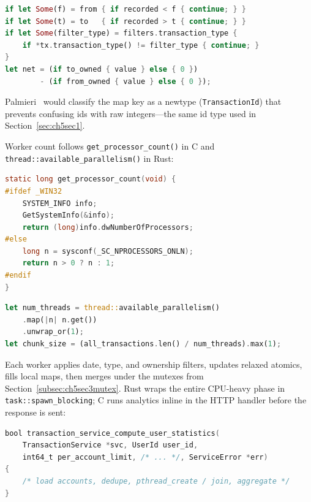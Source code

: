 \begin{lstlisting}[language=Rust, caption={transaction.rs (service) --- Same filters
inside the scoped worker.}]
if let Some(f) = from { if recorded < f { continue; } }
if let Some(t) = to   { if recorded > t { continue; } }
if let Some(filter_type) = filters.transaction_type {
    if *tx.transaction_type() != filter_type { continue; }
}
let net = (if to_owned { value } else { 0 })
        - (if from_owned { value } else { 0 });
\end{lstlisting}

Palmieri~\cite{Palmieri2022} would classify the map key as a newtype
(\texttt{TransactionId}) that prevents confusing ids with raw integers---the same id
type used in Section~\ref{sec:ch5sec1}.

Worker count follows \texttt{get\_processor\_count()} in C and
\texttt{thread::available\_parallelism()} in Rust:

\begin{lstlisting}[language=C, caption={transaction\_service.c --- Thread count from
the host OS.}]
static long get_processor_count(void) {
#ifdef _WIN32
    SYSTEM_INFO info;
    GetSystemInfo(&info);
    return (long)info.dwNumberOfProcessors;
#else
    long n = sysconf(_SC_NPROCESSORS_ONLN);
    return n > 0 ? n : 1;
#endif
}
\end{lstlisting}

\begin{lstlisting}[language=Rust, caption={transaction.rs (service) --- Same intent.}]
let num_threads = thread::available_parallelism()
    .map(|n| n.get())
    .unwrap_or(1);
let chunk_size = (all_transactions.len() / num_threads).max(1);
\end{lstlisting}

Each worker applies date, type, and ownership filters, updates relaxed atomics, fills
local maps, then merges under the mutexes from Section~\ref{subsec:ch5sec3mutex}.
Rust wraps the entire CPU-heavy phase in \texttt{task::spawn\_blocking}; C runs analytics
inline in the HTTP handler before the response is sent:

\begin{lstlisting}[language=C, caption={transaction\_service.c --- No runtime offload;
\texttt{pthread} workers run in the request thread's call stack.}]
bool transaction_service_compute_user_statistics(
    TransactionService *svc, UserId user_id,
    int64_t per_account_limit, /* ... */, ServiceError *err)
{
    /* load accounts, dedupe, pthread_create / join, aggregate */
}
\end{lstlisting}

